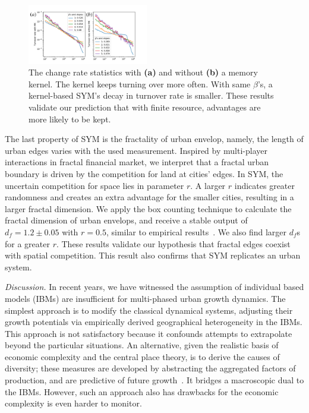 \documentclass[reprint,unsortedaddress,amsmath,amssymb,aps,prl,showkeys]{revtex4-2}
\begin{document}
\begin{figure}
	\centering
	\includegraphics[width = 0.47\textwidth]{pics/turnoverrate.pdf}
	\caption{The change rate statistics with \textbf{(a)} and without \textbf{(b)} a memory kernel. The kernel keeps turning over more often. With same $\beta$'s, a kernel-based SYM's decay in turnover rate is smaller. These results validate our prediction that with finite resource, advantages are more likely to be kept.}
	\label{changerate}
\end{figure}

The last property of SYM is the fractality of urban envelop, namely, the length of urban edges varies with the used measurement. Inspired by multi-player interactions in fractal financial market\cite{PhysRevE.65.037106}, we interpret that a fractal urban boundary is driven by the competition for land at cities' edges. In SYM, the uncertain competition for space lies in parameter $r$. A larger $r$ indicates greater randomness and creates an extra advantage for the smaller cities, resulting in a larger fractal dimension. We apply the box counting technique to calculate the fractal dimension of urban envelops, and receive a stable output of $d_f = 1.2\pm 0.05$ with $r = 0.5$, similar to empirical results~\cite{batty1992form}. We also find larger $d_f$s for a greater $r$. These results validate our hypothesis that fractal edges coexist with spatial competition. This result also confirms that SYM replicates an urban system.

\textit{Discussion.} In recent years, we have witnessed the assumption of individual based models (IBMs) are insufficient for multi-phased urban growth dynamics. The simplest approach is to modify the classical dynamical systems, adjusting their growth potentials via empirically derived geographical heterogeneity in the IBMs. This approach is not satisfactory because it confounds attempts to extrapolate beyond the particular situations. An alternative, given the realistic basis of economic complexity and the central place theory, is to derive the causes of diversity; these measures are developed by abstracting the aggregated factors of production, and are predictive of future growth~\cite{Hidalgo10570}. It bridges a macroscopic dual to the IBMs. However, such an approach also has drawbacks for the economic complexity is even harder to monitor. 
\end{document}
